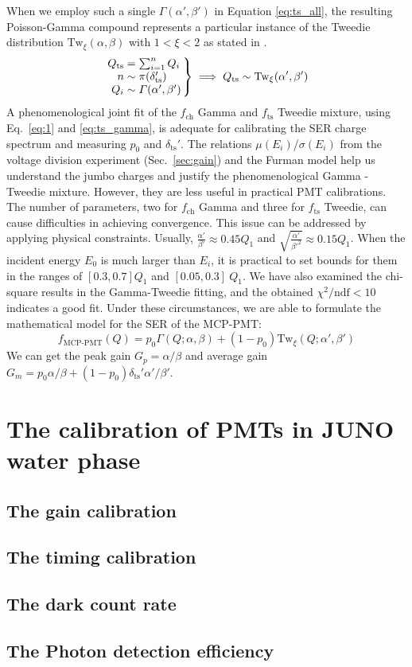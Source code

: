 When we employ such a single \(\varGamma(\alpha', \beta')\) in Equation \eqref{eq:ts_all}, the resulting Poisson-Gamma compound represents a particular instance of the Tweedie distribution $\mathrm{Tw}_{\xi}(\alpha,\beta)$ with \(1 < \xi < 2\) as stated in \cite{1991Tweedie}.
\begin{equation}
	\arraycolsep=1.4pt
	\label{eq:ts_gamma}
	\left.\begin{array}{rl}
		Q_{\text{ts}} & = \sum_{{i}=1}^{n} Q_{i}                 \\
		n             & \sim \mathrm{\pi}(\delta_{\mathrm{ts}}') \\
		Q_{i}         & \sim \varGamma(\alpha', \beta')
	\end{array}\right\} \implies
	Q_{\text{ts}} \sim \mathrm{Tw}_{\xi}(\alpha',\beta')
\end{equation}
A phenomenological joint fit of the \(f_\mathrm{ch}\) Gamma and \(f_\mathrm{ts}\) Tweedie mixture, using Eq.~\eqref{eq:1} and \eqref{eq:ts_gamma}, is adequate for calibrating the SER charge spectrum and measuring \(p_0\) and \(\delta_\text{ts}'\). The relations \(\mu(E_i)\)/\(\sigma(E_i)\) from the voltage division experiment (Sec.~\ref{sec:gain}) and the Furman model help us understand the jumbo charges and justify the phenomenological Gamma - Tweedie mixture. However, they are less useful in practical PMT calibrations.
The number of parameters, two for \(f_\mathrm{ch}\) Gamma and three for \(f_\mathrm{ts}\) Tweedie, can cause difficulties in achieving convergence. This issue can be addressed by applying physical constraints. Usually, $\frac{\alpha'}{\beta'}\approx 0.45Q_1$ and \(\sqrt{\frac{\alpha'}{\beta'^2}}\approx 0.15Q_1\). When the incident energy \(E_0\) is much larger than \(E_{i}\), it is practical to set bounds for them in the ranges of $[0.3,0.7]Q_1$ and $[0.05,0.3]~Q_1$.
We have also examined the chi-square results in the Gamma-Tweedie fitting, and the obtained $\chi^2/\mathrm{ndf}<10$ indicates a good fit. Under these circumstances, we are able to formulate the mathematical model for the SER of the MCP-PMT:
\begin{equation}
	\label{eq:GTmodel}
	f_{\text{MCP-PMT}}(Q) = p_0 \varGamma(Q; \alpha, \beta) + (1-p_0) \mathrm{Tw}_{\xi}(Q; \alpha', \beta')
\end{equation}
We can get the peak gain $G_p=\alpha/\beta$ and average gain $G_m=p_0\alpha/\beta+(1-p_0)\delta_{\mathrm{ts}}'\alpha'/\beta'$.
\section{The calibration of PMTs in JUNO water phase}
\subsection{The gain calibration}
\subsection{The timing calibration}
\subsection{The dark count rate}
\subsection{The Photon detection efficiency}